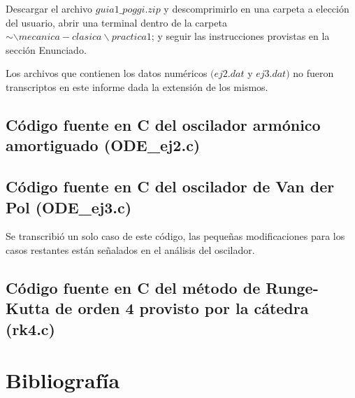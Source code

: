 \documentclass[a4paper,12pt]{article}
\begin{document}
Descargar el archivo $guia1\_poggi.zip$ y descomprimirlo en una carpeta a elecci\'on del usuario, abrir una terminal dentro de la carpeta $\sim \backslash mecanica-clasica\backslash practica1$; y seguir las instrucciones provistas en la secci\'on Enunciado.

Los archivos que contienen los datos num\'ericos $(ej2.dat$ y $ej3.dat)$ no fueron transcriptos en este informe dada la extensi\'on de los mismos.


\subsection{C\'odigo fuente en C del oscilador arm\'onico amortiguado (ODE\_ej2.c)}



\subsection{C\'odigo fuente en C del oscilador de Van der Pol (ODE\_ej3.c)}
Se transcribi\'o un solo caso de este c\'odigo, las peque\~nas modificaciones para los casos restantes est\'an se\~nalados en el an\'alisis del oscilador.



\subsection{C\'odigo fuente en C del m\'etodo de Runge-Kutta de orden 4 provisto por la c\'atedra (rk4.c)}


\section{Bibliograf\'ia}
\end{document}
